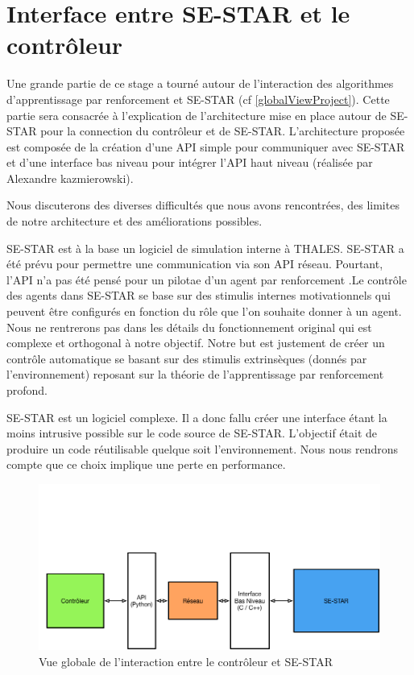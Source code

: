 
\section{Interface entre SE-STAR et le contrôleur}

Une grande partie de ce stage a tourné autour de l'interaction des algorithmes d'apprentissage par renforcement et SE-STAR (cf \ref{globalViewProject}). Cette partie sera consacrée à l'explication de l'architecture mise en place autour de SE-STAR pour la connection du contrôleur et de SE-STAR.
L'architecture proposée est composée de la création d'une \gls{API} simple pour communiquer avec SE-STAR et d'une interface bas niveau pour intégrer l'\gls{API} haut niveau (réalisée par Alexandre  kazmierowski).

Nous discuterons des diverses difficultés que nous avons rencontrées, des limites de notre architecture et des améliorations possibles.


SE-STAR est à la base un logiciel de simulation interne à THALES. SE-STAR a été prévu pour permettre une communication via son \gls{API} réseau. Pourtant, l'API n'a pas été pensé pour un pilotae d'un agent par renforcement .Le contrôle des agents dans SE-STAR se base sur des stimulis internes motivationnels qui peuvent être configurés en fonction du rôle que l'on souhaite donner à un agent. Nous ne rentrerons pas dans les détails du fonctionnement original qui est complexe et orthogonal à notre objectif. Notre but est justement de créer un contrôle automatique se basant sur des stimulis extrinsèques (donnés par l'environnement) reposant sur la théorie de l'apprentissage par renforcement profond.

SE-STAR est un logiciel complexe. Il a donc fallu créer une interface étant la moins intrusive possible sur le code source de SE-STAR. L'objectif était de produire un code réutilisable quelque soit l'environnement. Nous nous rendrons compte que ce choix implique une perte en performance.

\begin{figure}[!h]
\centering
\includegraphics[width=.9\linewidth]{./assets/interfaceReseau/overviewInterface}
\caption{Vue globale de l'interaction entre le contrôleur et SE-STAR}
\end{figure}

